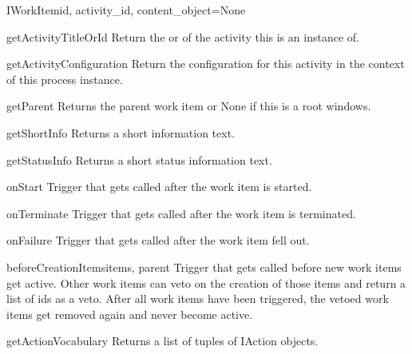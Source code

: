 \begin{classdesc}{IWorkItem}{id, activity_id, content_object=None}
      \begin{funcdesc}{getActivityTitleOrId}{}
          Return the  or  of the activity this is an 
          instance of.
      \end{funcdesc}

      \begin{funcdesc}{getActivityConfiguration}{}
          Return the configuration for this activity in the context of 
          this process instance.
      \end{funcdesc}

      \begin{funcdesc}{getParent}{}
          Returns the parent work item or None if this is a root windows.
      \end{funcdesc}

      \begin{funcdesc}{getShortInfo}{}
          Returns a short information text. %
      \end{funcdesc}

      \begin{funcdesc}{getStatusInfo}{}
          Returns a short status information text.
      \end{funcdesc}

      \begin{funcdesc}{onStart}{}
          Trigger that gets called after the work item is started.
      \end{funcdesc}

      \begin{funcdesc}{onTerminate}{}
          Trigger that gets called after the work item is terminated.
      \end{funcdesc}

      \begin{funcdesc}{onFailure}{}
          Trigger that gets called after the work item fell out.
      \end{funcdesc}

      \begin{funcdesc}{beforeCreationItems}{items, parent}
          Trigger that gets called before new work items get active. 
          Other work items can veto on the creation of those items and 
          return a list of ids as a veto. After all work items have 
          been triggered, the vetoed work items get removed again and 
          never become active.
      \end{funcdesc}

      \begin{funcdesc}{getActionVocabulary}{}
          Returns a list of tuples of IAction objects.
      \end{funcdesc}


\end{classdesc}
